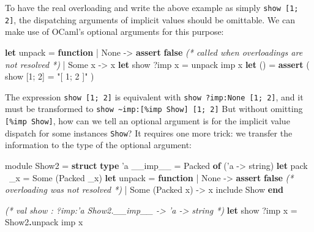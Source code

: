 \documentclass{article}
\newenvironment{Shaded}{}{}
\newcommand{\KeywordTok}[1]{\textcolor[rgb]{0.00,0.22,0.06}{\textbf{{#1}}}}
\newcommand{\DataTypeTok}[1]{\textcolor[rgb]{0.28,0.06,0.00}{{#1}}}
\newcommand{\StringTok}[1]{\textcolor[rgb]{0.12,0.22,0.30}{{#1}}}
\newcommand{\CommentTok}[1]{\textcolor[rgb]{0.19,0.30,0.30}{\textit{{#1}}}}
\newcommand{\OtherTok}[1]{\textcolor[rgb]{0.00,0.22,0.06}{{#1}}}
\newcommand{\NormalTok}[1]{{#1}}
\begin{document}
To have the real overloading and write the above example as simply
\texttt{show {[}1; 2{]}}, the dispatching arguments of implicit values
should be omittable. We can make use of OCaml's optional arguments for
this purpose:

\begin{Shaded}
\begin{Highlighting}[]
  \KeywordTok{let} \NormalTok{unpack = }\KeywordTok{function}
    \NormalTok{| }\DataTypeTok{None} \NormalTok{-> }\KeywordTok{assert} \KeywordTok{false} \CommentTok{(* called when overloadings are not resolved *)}
    \NormalTok{| }\DataTypeTok{Some} \NormalTok{x -> x}
  \KeywordTok{let} \NormalTok{show ?imp x = unpack imp x}
  \KeywordTok{let} \NormalTok{() = }\KeywordTok{assert} \NormalTok{( show [1; 2] = }\StringTok{"[ 1; 2 ]"} \NormalTok{)}
\end{Highlighting}
\end{Shaded}

The expression \texttt{show {[}1; 2{]}} is equivalent with
\texttt{show ?imp:None {[}1; 2{]}}, and it must be transformed to
\texttt{show \textasciitilde{}imp:{[}\%imp Show{]} {[}1; 2{]}} 
But without omitting
\texttt{{[}\%imp Show{]}}, how can we tell an optional argument is for
the implicit value dispatch for some instances \texttt{Show}? It
requires one more trick: we transfer the information to the type of the
optional argument:

\begin{Shaded}
\begin{Highlighting}[]
  \OtherTok{module} \NormalTok{Show2 = }\KeywordTok{struct}
    \KeywordTok{type} \NormalTok{'a __imp__ = }\DataTypeTok{Packed} \KeywordTok{of} \NormalTok{('a -> }\DataTypeTok{string}\NormalTok{)}
    \KeywordTok{let} \NormalTok{pack ~_x = }\DataTypeTok{Some} \NormalTok{(}\DataTypeTok{Packed} \NormalTok{_x)}
    \KeywordTok{let} \NormalTok{unpack = }\KeywordTok{function}
      \NormalTok{| }\DataTypeTok{None} \NormalTok{-> }\KeywordTok{assert} \KeywordTok{false} \CommentTok{(* overloading was not resolved *)}
      \NormalTok{| }\DataTypeTok{Some} \NormalTok{(}\DataTypeTok{Packed} \NormalTok{x) -> x}
    \OtherTok{include} \NormalTok{Show}
  \KeywordTok{end}
  
  \CommentTok{(* val show : ?imp:'a Show2.__imp__ -> 'a -> string *)}
  \KeywordTok{let} \NormalTok{show ?imp x = Show2}\KeywordTok{.}\NormalTok{unpack imp x}
\end{Highlighting}
\end{Shaded}
\end{document}
